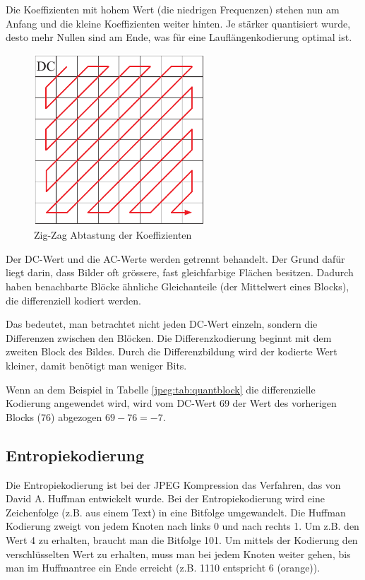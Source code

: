 Die Koeffizienten mit hohem Wert (die niedrigen Frequenzen) stehen nun am Anfang und die kleine Koeffizienten weiter hinten.
Je stärker quantisiert wurde, desto mehr Nullen sind am Ende, was für eine Lauflängenkodierung optimal ist.

\begin{figure}
    \centering
    \includegraphics[width=64mm]{papers/jpeg/pictures/zigzag.pdf}
    \caption{Zig-Zag Abtastung der Koeffizienten
        \label{jpeg:fig:zigzag}}
\end{figure}

Der DC-Wert und die AC-Werte werden getrennt behandelt.
Der Grund dafür liegt darin, dass Bilder oft grössere, fast gleichfarbige Flächen besitzen.
Dadurch haben benachbarte Blöcke ähnliche Gleichanteile (der Mittelwert eines Blocks), die differenziell kodiert werden.

Das bedeutet, man betrachtet nicht jeden DC-Wert einzeln, sondern die Differenzen zwischen den Blöcken.
Die Differenzkodierung beginnt mit dem zweiten Block des Bildes.
Durch die Differenzbildung wird der kodierte Wert kleiner, damit benötigt man weniger Bits.

Wenn an dem Beispiel in Tabelle \ref{jpeg:tab:quantblock} die differenzielle Kodierung angewendet wird, wird vom DC-Wert 69 der Wert des vorherigen Blocks (76) abgezogen \(69-76 = -7\).

\subsection{Entropiekodierung
\label{jpeg:subsection:entropiekodierung}}
Die Entropiekodierung ist bei der JPEG Kompression das Verfahren, das von David A. Huffman entwickelt wurde.
Bei der Entropiekodierung wird eine Zeichenfolge (z.B. aus einem Text) in eine Bitfolge umgewandelt.
Die Huffman Kodierung zweigt von jedem Knoten nach links 0 und nach rechts 1.
Um z.B. den Wert 4 zu erhalten, braucht man die Bitfolge 101.
Um mittels der Kodierung den verschlüsselten Wert zu erhalten, muss man bei jedem Knoten weiter gehen, bis man im Huffmantree ein Ende erreicht (z.B. 1110 entspricht 6 (orange)).

